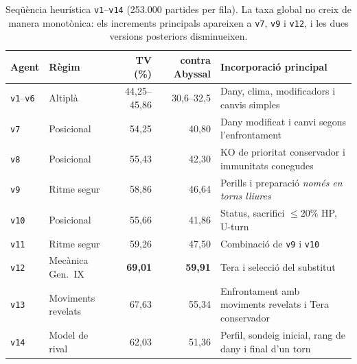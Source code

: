 \begin{table}[htbp]
\centering
\caption[Seqüència heurística \texttt{v1}--\texttt{v14}.]{Seqüència heurística \texttt{v1}--\texttt{v14} (253.000 partides per fila). La taxa global no creix de manera monotònica: els increments principals apareixen a \texttt{v7}, \texttt{v9} i \texttt{v12}, i les dues versions posteriors disminueixen.}
\label{tab:heur_ladder}
\small
\begin{tabularx}{\textwidth}{llrr>{\raggedright\arraybackslash}X}
\toprule
\textbf{Agent} & \textbf{Règim} & \textbf{TV (\%)} & \textbf{contra Abyssal} & \textbf{Incorporació principal} \\
\midrule
\texttt{v1}--\texttt{v6} & Altiplà & 44,25--45,86 & 30,6--32,5 & Dany, clima, modificadors i canvis simples \\
\texttt{v7} & Posicional & 54,25 & 40,80 & Dany modificat i canvi segons l'enfrontament \\
\texttt{v8} & Posicional & 55,43 & 42,30 & KO de prioritat conservador i immunitats conegudes \\
\texttt{v9} & Ritme segur & 58,86 & 46,64 & Perills i preparació \emph{només en torns lliures} \\
\texttt{v10} & Posicional & 55,66 & 41,86 & Status, sacrifici $\le 20\%$ HP, U-turn \\
\texttt{v11} & Ritme segur & 59,26 & 47,50 & Combinació de \texttt{v9} i \texttt{v10} \\
\texttt{v12} & Mecànica Gen.~IX & \textbf{69,01} & \textbf{59,91} & Tera i selecció del substitut \\
\texttt{v13} & Moviments revelats & 67,63 & 55,34 & Enfrontament amb moviments revelats i Tera conservador \\
\texttt{v14} & Model de rival & 62,03 & 51,36 & Perfil, sondeig inicial, rang de dany i final d'un torn \\
\bottomrule
\end{tabularx}
\end{table}
